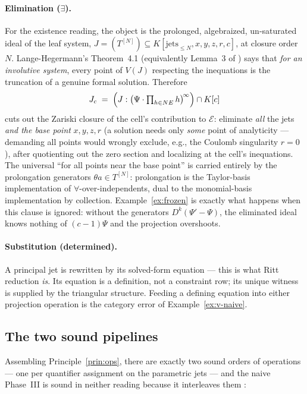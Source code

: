 \documentclass[11pt]{article}
\newcommand{\Psib}{\Psi}
\newcommand{\Ex}{\mathcal{E}}
\begin{document}
\paragraph{Elimination ($\exists$).}
For the existence reading, the object is the prolonged, algebraized,
un-saturated ideal of the leaf system,
$J = (T^{[N]}) \subseteq K[\text{jets}_{\le N}, x,y,z,r, c]$, at closure
order $N$. Lange-Hegermann's Theorem~4.1 \cite{LH2014} (equivalently Lemma~3
of \cite{bounded-prolongation-note}) says that \emph{for an involutive
system}, every point of $V(J)$ respecting the inequations is the truncation
of a genuine formal solution. Therefore
\begin{equation}
\label{eq:elimination}
J_c \;=\; \Bigl(J : \bigl(\Psib\cdot\textstyle\prod_{h\in NE}h\bigr)^{\!\infty}\Bigr)
      \cap K[c]
\end{equation}
cuts out the Zariski closure of the cell's contribution to $\Ex$: eliminate
\emph{all} the jets \emph{and the base point} $x,y,z,r$ (a solution needs only
\emph{some} point of analyticity --- demanding all points would wrongly
exclude, e.g., the Coulomb singularity $r=0$), after quotienting out the zero
section and localizing at the cell's inequations. The universal
``for all points near the base point'' is carried entirely by the
prolongation generators $\theta a \in T^{[N]}$: prolongation is the
Taylor-basis implementation of $\forall$-over-independents, dual to the
monomial-basis implementation by collection. Example~\ref{ex:frozen} is
exactly what happens when this clause is ignored: without the generators
$D^k(\Psib'-\Psib)$, the eliminated ideal knows nothing of $(c-1)\Psib$ and
the projection overshoots.

\paragraph{Substitution (determined).}
A principal jet is rewritten by its solved-form equation --- this is what
Ritt reduction \emph{is}. Its equation is a definition, not a constraint row;
its unique witness is supplied by the triangular structure. Feeding a
defining equation into either projection operation is the category error of
Example~\ref{ex:v-naive}.

\subsection{The two sound pipelines}

Assembling Principle~\ref{prin:ops}, there are exactly two sound orders of
operations --- one per quantifier assignment on the parametric jets --- and
the naive Phase~III is sound in neither reading because it interleaves them
\cite[Finding~3: ``exactly one $\forall$ algorithm and one $\exists$
algorithm'']{existence-route-report}:
\end{document}
